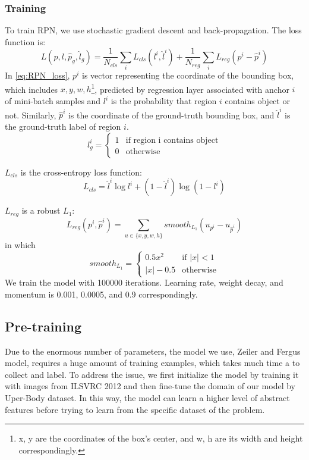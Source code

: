 \documentclass[conference]{IEEEtran}
\begin{document}
\subsubsection{Training}
To train RPN, we use stochastic gradient descent and back-propagation. The loss function is:
\begin{equation}\label{eq:RPN_loss}
L(p, l, \hat{p}_g, \hat{l}_g) = \frac{1}{N_{cls}}\sum_{i}L_{cls}(l^i, \hat{l}^i) + \frac{1}{N_{reg}}\sum_{i} L_{reg}(p^i - \hat{p}^i)
\end{equation}
In \ref{eq:RPN_loss}, $p^i$ is vector representing the coordinate of the bounding box, which includes ${x, y, w, h}$\footnote{x, y are the coordinates of the box's center, and w, h are its width and height correspondingly.}, predicted by regression layer associated with anchor $i$ of mini-batch samples and $l^i$ is the probability that region $i$ contains object or not. Similarly, $\hat{p}^i$ is the coordinate of the ground-truth bounding box, and $\hat{l}^i$ is the ground-truth label of region $i$.
\begin{equation}
l^i_g = 
\begin{cases}
1 & \text{if region i contains object} \\
0 & \text{otherwise}
\end{cases}
\end{equation}

$L_{cls}$ is the cross-entropy loss function:
\begin{equation}
L_{cls} = \hat{l}^i \log{l^i} + (1-\hat{l}^i) \log(1-l^i)
\end{equation}

$L_{reg}$ is a robust $L_1$\cite{fastRCNN}:
\begin{equation}
L_{reg}(p^i, \hat{p}^i) = \sum_{u \in \{x, y, w, h\}} smooth_{L_1}(u_{p^i} - u_{\hat{p}^i})
\end{equation}
in which
\begin{equation}
smooth_{L_1} = 
\begin{cases}
0.5x^2 & \text{if } |x| < 1\\
|x| - 0.5 & \text{otherwise}
\end{cases}
\end{equation}
We train the model with 100000 iterations. Learning rate, weight decay, and momentum is 0.001, 0.0005, and 0.9 correspondingly.
\subsection{Pre-training}
Due to the enormous number of parameters, the model we use, Zeiler and Fergus model, requires a huge amount of training examples, which takes much time a to collect and label. To address the issue, we first initialize the model by training it with images from ILSVRC 2012 and then fine-tune the domain of our model by Uper-Body dataset. In this way, the model can learn a higher level of abstract features before trying to learn from the specific dataset of the problem. %
\end{document}
